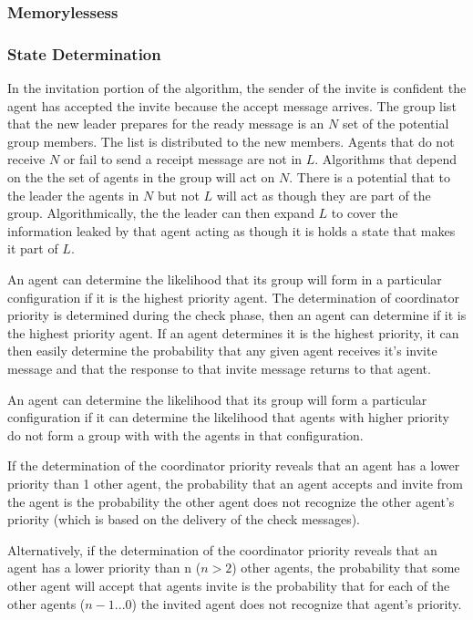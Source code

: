 \subsubsection{Memorylessess}

\subsubsection{State Determination}

In the invitation portion of the algorithm, the sender of the invite is confident the agent has accepted the invite because the accept message arrives. The group list that the new leader prepares for the ready message is an $N$ set of the potential group members. The list is distributed to the new members. Agents that do not receive $N$ or fail to send a receipt message are not in $L$. Algorithms that depend on the the set of agents in the group will act on $N$. There is a potential that to the leader the agents in $N$ but not $L$ will act as though they are part of the group. Algorithmically, the the leader can then expand $L$ to cover the information leaked by that agent acting as though it is holds a state that makes it part of $L$.

An agent can determine the likelihood that its group will form in a particular configuration if it is the highest priority agent. The determination of coordinator priority is determined during the check phase, then an agent can determine if it is the highest priority agent. If an agent determines it is the highest priority, it can then easily determine the probability that any given agent receives it's invite message and that the response to that invite message returns to that agent.

An agent can determine the likelihood that its group will form a particular configuration if it can determine the likelihood that agents with higher priority do not form a group with with the agents in that configuration.

If the determination of the coordinator priority reveals that an agent has a lower priority than 1 other agent, the probability that an agent accepts and invite from the agent is the probability the other agent does not recognize the other agent's priority (which is based on the delivery of the check messages).

Alternatively, if the determination of the coordinator priority reveals that an agent has a lower priority than n ($n > 2$) other agents, the probability that some other agent will accept that agents invite is the probability that for each of the other agents ($n-1 ... 0$) the invited agent does not recognize that agent's priority.

